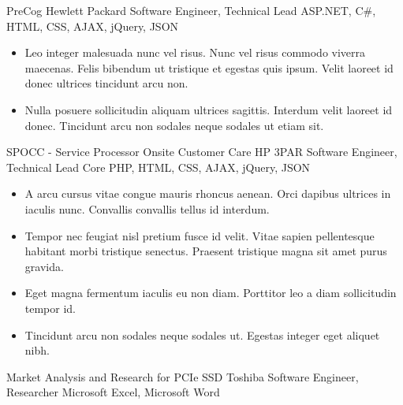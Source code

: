 \documentclass[10pt, a4paper]{cvhari}
\begin{document}
        \dividergray
        
        \project
            {PreCog}
            {Hewlett Packard}
            {Software Engineer, Technical Lead}
            {ASP.NET, C\#, HTML, CSS, AJAX, jQuery, JSON}
        
        \begin{itemize}
            \item Leo integer malesuada nunc vel risus. Nunc vel risus commodo viverra maecenas. Felis bibendum ut tristique et egestas quis ipsum. Velit laoreet id donec ultrices tincidunt arcu non.\smallskip
            \item Nulla posuere sollicitudin aliquam ultrices sagittis. Interdum velit laoreet id donec. Tincidunt arcu non sodales neque sodales ut etiam sit.\smallskip
        \end{itemize}
        
        \dividergray

        \project
            {SPOCC - Service Processor Onsite Customer Care}
            {HP 3PAR}
            {Software Engineer, Technical Lead}
            {Core PHP, HTML, CSS, AJAX, jQuery, JSON}
        
        \begin{itemize}
            \item A arcu cursus vitae congue mauris rhoncus aenean. Orci dapibus ultrices in iaculis nunc. Convallis convallis tellus id interdum.\smallskip
            \item Tempor nec feugiat nisl pretium fusce id velit. Vitae sapien pellentesque habitant morbi tristique senectus. Praesent tristique magna sit amet purus gravida.\smallskip
            \item Eget magna fermentum iaculis eu non diam. Porttitor leo a diam sollicitudin tempor id.\smallskip
            \item Tincidunt arcu non sodales neque sodales ut. Egestas integer eget aliquet nibh. \smallskip
        \end{itemize}
        
        \dividergray
        
        \project
            {Market Analysis and Research for PCIe SSD}
            {Toshiba}
            {Software Engineer, Researcher}
            {Microsoft Excel, Microsoft Word}
        
\end{document}
